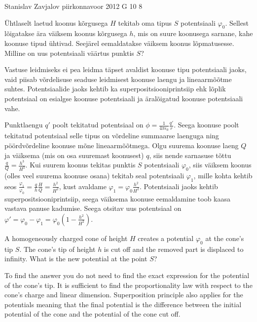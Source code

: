 {Stanislav Zavjalov} %
{piirkonnavoor} %
{2012} %
{G 10} %
{8} %
{
\ifStatement
Ühtlaselt laetud koonus kõrgusega $H$ tekitab oma tipus $S$ potentsiaali
$\varphi_0$. Sellest lõigatakse ära väiksem koonus kõrgusega $h$, mis on suure
koonusega sarnane, kahe koonuse tipud ühtivad. Seejärel eemaldatakse väiksem koonus
lõpmatusesse. Milline on uus potentsiaali väärtus punktis $S$?
\fi


\ifHint
Vastuse leidmiseks ei pea leidma täpset avaldist koonuse tipu potentsiaali jaoks, vaid piisab võrdelisuse seaduse leidmisest koonuse laengu ja lineaarmõõtme suhtes. Potentsiaalide jaoks kehtib ka superpositsiooniprintsiip ehk lõplik potentsiaal on esialgse koonuse potentsiaali ja äralõigatud koonuse potentsiaali vahe.
\fi


\ifSolution
Punktlaengu $q'$ poolt tekitatud potentsiaal on $\phi = \frac{1}{4 \pi \epsilon_0} \frac{q'}{r}$. Seega koonuse poolt tekitatud potentsiaal selle tipus on võrdeline summaarse laenguga ning pöördvõrdeline koonuse mõne lineaarmõõtmega. Olgu suurema koonuse laeng $Q$ ja väiksema (mis on osa suuremast koonusest) $q$, siis nende sarnasuse tõttu $\frac{q}{Q} = \frac{h^3}{H^3}$. Kui suurem koonus tekitas punktis $S$ potentsiaali $\varphi_0$, siis väiksem koonus (olles veel suurema koonuse osana) tekitab seal potentsiaali $\varphi_1$, mille kohta kehtib seos $\frac{\varphi_1}{\varphi_0} = \frac{q}{h} \frac{H}{Q} = \frac{h^2}{H^2}$, kust avaldame $\varphi_1 = \varphi_0 \frac{h^2}{H^2}$. Potentsiaali jaoks kehtib superpositsiooniprintsiip, seega väiksema koonuse eemaldamine toob kaasa vastava panuse kadumise. Seega otsitav uus potentsiaal on $\varphi' = \varphi_0 - \varphi_1 = \varphi_0 ( 1 - \frac{h^2}{H^2})$.
\fi


\ifEngStatement
A homogeneously charged cone of height $H$ creates a potential $\varphi_0$ at the cone’s tip $S$. The cone’s tip of height $h$ is cut off and the removed part is displaced to infinity. What is the new potential at the point $S$?
\fi


\ifEngHint
To find the answer you do not need to find the exact expression for the potential of the cone's tip. It is sufficient to find the proportionality law with respect to the cone's charge and linear dimension. Superposition principle also applies for the potentials meaning that the final potential is the difference between the initial potential of the cone and the potential of the cone cut off.
\fi


}
